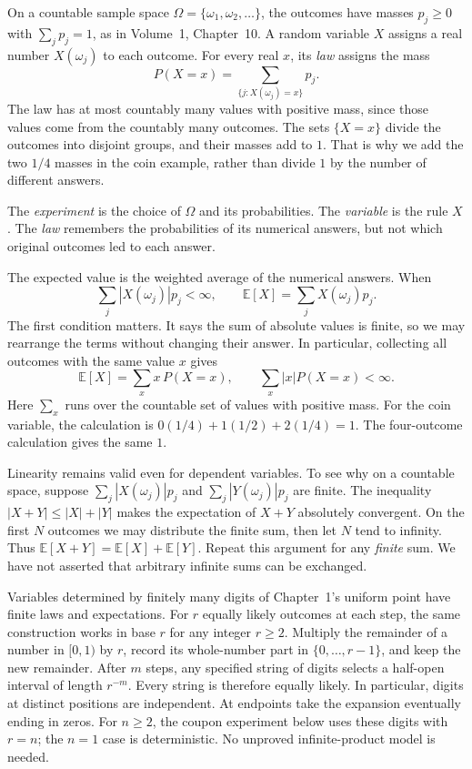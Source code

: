 On a countable sample space $\Omega=\{\omega_1,\omega_2,\ldots\}$, the outcomes have masses $p_j\ge0$ with $\sum_jp_j=1$, as in Volume~1, Chapter~10. A random variable $X$ assigns a real number $X(\omega_j)$ to each outcome. For every real $x$, its \emph{law} assigns the mass
\[
 P(X=x)=\sum_{\{j:X(\omega_j)=x\}}p_j.
\]
The law has at most countably many values with positive mass, since those values come from the countably many outcomes. The sets $\{X=x\}$ divide the outcomes into disjoint groups, and their masses add to $1$. That is why we add the two $1/4$ masses in the coin example, rather than divide $1$ by the number of different answers.

The \emph{experiment} is the choice of $\Omega$ and its probabilities. The \emph{variable} is the rule $X$. The \emph{law} remembers the probabilities of its numerical answers, but not which original outcomes led to each answer.

The expected value is the weighted average of the numerical answers. When
\[
 \sum_j|X(\omega_j)|p_j<\infty,
 \qquad \mathbb E[X]=\sum_jX(\omega_j)p_j.
\]
The first condition matters. It says the sum of absolute values is finite, so we may rearrange the terms without changing their answer. In particular, collecting all outcomes with the same value $x$ gives
\[
 \mathbb E[X]=\sum_x x\,P(X=x),
 \qquad \sum_x|x|P(X=x)<\infty.
\]
Here $\sum_x$ runs over the countable set of values with positive mass. For the coin variable, the calculation is $0(1/4)+1(1/2)+2(1/4)=1$. The four-outcome calculation gives the same $1$.

Linearity remains valid even for dependent variables. To see why on a countable space, suppose $\sum_j|X(\omega_j)|p_j$ and $\sum_j|Y(\omega_j)|p_j$ are finite. The inequality $|X+Y|\le|X|+|Y|$ makes the expectation of $X+Y$ absolutely convergent. On the first $N$ outcomes we may distribute the finite sum, then let $N$ tend to infinity. Thus $\mathbb E[X+Y]=\mathbb E[X]+\mathbb E[Y]$. Repeat this argument for any \emph{finite} sum. We have not asserted that arbitrary infinite sums can be exchanged.

Variables determined by finitely many digits of Chapter~1's uniform point have finite laws and expectations. For $r$ equally likely outcomes at each step, the same construction works in base $r$ for any integer $r\ge2$. Multiply the remainder of a number in $[0,1)$ by $r$, record its whole-number part in $\{0,\ldots,r-1\}$, and keep the new remainder. After $m$ steps, any specified string of digits selects a half-open interval of length $r^{-m}$. Every string is therefore equally likely. In particular, digits at distinct positions are independent. At endpoints take the expansion eventually ending in zeros. For $n\ge2$, the coupon experiment below uses these digits with $r=n$; the $n=1$ case is deterministic. No unproved infinite-product model is needed.

